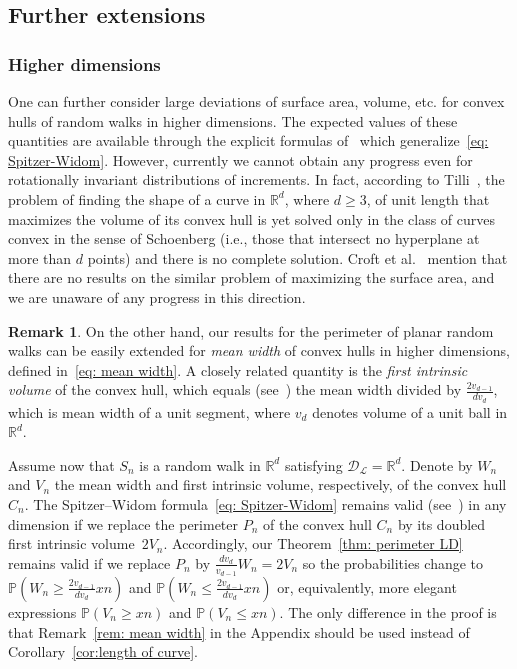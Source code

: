 \documentclass[10pt]{amsart}
\theoremstyle{definition}\newtheorem{defi}[theo]{Definition}\newtheorem{rema}[theo]{Remark}\newtheorem{exam}[theo]{Example}\newtheorem{exem}[theo]{Example}\newtheorem{nota}[theo]{Notation}
\newcommand{\Rbb}{\mathbb{R}}
\newcommand{\Pbb}{\mathbb{P}}
\newcommand{\Dcl}{\mathcal{D}}
\newcommand{\Lcl}{\mathcal{L}}
\begin{document}
\subsection{Further extensions} \label{sec: further}
\subsubsection{Higher dimensions}

One can further consider large deviations of surface area, volume, etc. for convex hulls of random walks in higher dimensions. The expected values of these quantities are available through the explicit formulas of~\cite[Section~4]{VysotskyZaporozhets} which generalize~\eqref{eq: Spitzer-Widom}. However, currently we cannot obtain any progress even for rotationally invariant distributions of increments. In fact, according to Tilli~\cite{Tilli}, the problem of finding the shape of a curve in $\Rbb^d$, where $d \ge 3$, of unit length that maximizes the volume of its convex hull is yet solved only in the class of curves convex in the sense of Schoenberg (i.e., those that intersect no hyperplane at more than $d$ points) and there is no complete solution. Croft et al.~\cite[Problem A28]{Croft+} mention that there are no results on the similar problem of maximizing the surface area, and we are unaware of any progress in this direction.

\begin{rema}\label{rem: thm mean width}
On the other hand, our results for the perimeter of planar random walks can be easily extended for \emph{mean width} of convex hulls in higher dimensions, defined in~\eqref{eq: mean width}. A closely related quantity is the \emph{first intrinsic volume} of the convex hull, which equals (see~\cite[Eq.~(14.7)]{SchneiderWeil}) the mean width divided by $\frac{2 v_{d-1}}{d v_d}$, which is mean width of a unit segment, where $v_d$ denotes volume of a unit ball in $\Rbb^d$.

Assume now that $S_n$ is a random walk in $\Rbb^d$ satisfying $\Dcl_{\Lcl} =\Rbb^d$. Denote by $W_n$ and $V_n$ the mean width and first intrinsic volume, respectively, of the convex hull $C_n$. The Spitzer--Widom formula~\eqref{eq: Spitzer-Widom} remains valid (see~\cite[Corollary~3]{VysotskyZaporozhets}) in any dimension if we replace the perimeter $P_n$ of the convex hull $C_n$ by its doubled first intrinsic volume~$2 V_n$. Accordingly, our Theorem~\ref{thm: perimeter LD} remains valid if we replace $P_n$ by $\frac{d v_d}{v_{d-1}} W_n = 2 V_n$ so the probabilities change to $\Pbb(W_n \ge \frac{2v_{d-1}}{d v_d} x n)$ and $\Pbb(W_n \le \frac{2v_{d-1}}{d v_d} x n)$ or, equivalently, more elegant expressions $\Pbb(V_n \ge x n)$ and $\Pbb(V_n \le x n)$. The only difference in the proof is that Remark~\ref{rem: mean width} in the Appendix should be used instead of Corollary~\ref{cor:length of curve}.
\end{rema}
\end{document}
